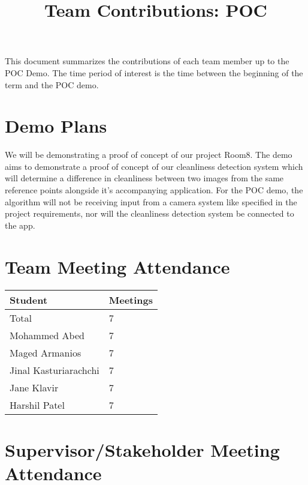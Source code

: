 \documentclass{article}
\title{Team Contributions: POC\\\progname}
\author{\authname}
\date{}
\begin{document}
\maketitle

This document summarizes the contributions of each team member up to the POC
Demo.  The time period of interest is the time between the beginning of the term
and the POC demo.

\section{Demo Plans}

We will be demonstrating a proof of concept of our project Room8. The demo aims to demonstrate a proof of concept of our cleanliness detection system which will determine a difference in cleanliness between two images from the same reference points alongside it's accompanying application. For the POC demo, the algorithm will not be receiving input from a camera system like specified in the project requirements, nor will the cleanliness detection system be connected to the app.
\section{Team Meeting Attendance}


\begin{table}[H]
\centering
\begin{tabular}{ll}
\toprule
\textbf{Student} & \textbf{Meetings}\\
\midrule
Total & 7\\
Mohammed Abed & 7\\
Maged Armanios & 7\\
Jinal Kasturiarachchi & 7\\
Jane Klavir & 7\\
Harshil Patel & 7\\
\bottomrule
\end{tabular}
\end{table}


\section{Supervisor/Stakeholder Meeting Attendance}
\end{document}
